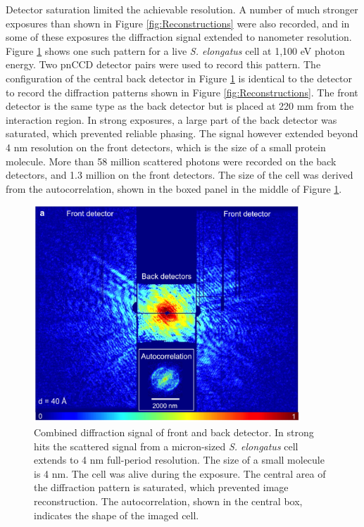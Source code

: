 Detector saturation limited the achievable resolution. A number of much stronger exposures than shown in Figure \ref{fig:Reconstructions} were also recorded, and in some of these exposures the diffraction signal extended to nanometer resolution. Figure \ref{fig:StrongHit} shows one such pattern for a live \textit{S. elongatus} cell at 1,100 eV photon energy. Two pnCCD detector pairs were used to record this pattern. The configuration of the central back detector in Figure \ref{fig:StrongHit} is identical to the detector to record the diffraction patterns shown in Figure \ref{fig:Reconstructions}. The front detector is the same type as the back detector but is placed at 220 mm from the interaction region. In strong exposures, a large part of the back detector was saturated, which prevented reliable phasing. The signal however extended beyond 4 nm resolution on the front detectors, which is the size of a small protein molecule. More than 58 million scattered photons were recorded on the back detectors, and 1.3 million on the front detectors. The size of the cell was derived from the autocorrelation, shown in the boxed panel in the middle of Figure \ref{fig:StrongHit}. 

\begin{figure}[!ht]
	\centering 
		\includegraphics[width=100mm]{StrongHit.png}
	\caption{Combined diffraction signal of front and back detector. In strong hits the scattered signal from a micron-sized \textit{S. elongatus} cell extends to 4 nm full-period resolution. The size of a small molecule is 4 nm. The cell was alive during the exposure. The central area of the diffraction pattern is saturated, which prevented image reconstruction. The autocorrelation, shown in the central box, indicates the shape of the imaged cell.}\label{fig:StrongHit}
\end{figure}

